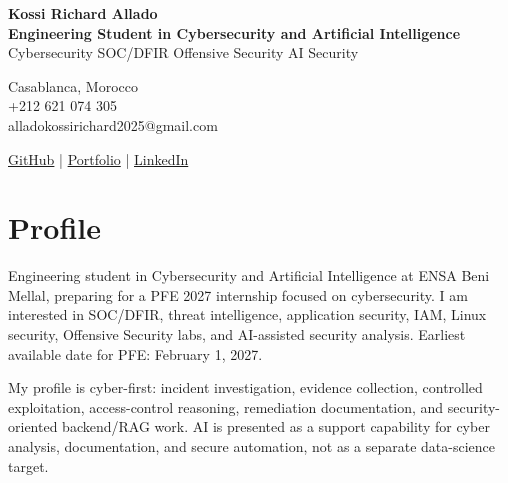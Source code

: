 \documentclass[10pt,a4paper]{article}
\begin{document}
\fontsize{10}{11.7}\selectfont

\begin{minipage}[t]{0.60\textwidth}
{\LARGE \textbf{Kossi Richard Allado}}\\[2pt]
\textbf{Engineering Student in Cybersecurity and Artificial Intelligence}\\[1pt]
Cybersecurity \textbar{} SOC/DFIR \textbar{} Offensive Security \textbar{} AI Security
\end{minipage}
\hfill
\begin{minipage}[t]{0.36\textwidth}
\raggedleft
Casablanca, Morocco\\
+212 621 074 305\\
alladokossirichard2025@gmail.com
\end{minipage}

\vspace{4pt}
\footnotesize
\href{https://github.com/ALLAKORI}{GitHub} \quad | \quad
\href{https://allakori.github.io/}{Portfolio} \quad | \quad
\href{https://www.linkedin.com/in/kossi-richard-allado-50177b2a5}{LinkedIn}
\normalsize

\section{Profile}
Engineering student in Cybersecurity and Artificial Intelligence at ENSA Beni Mellal, preparing for a PFE 2027 internship focused on cybersecurity. I am interested in SOC/DFIR, threat intelligence, application security, IAM, Linux security, Offensive Security labs, and AI-assisted security analysis. Earliest available date for PFE: February 1, 2027.

My profile is cyber-first: incident investigation, evidence collection, controlled exploitation, access-control reasoning, remediation documentation, and security-oriented backend/RAG work. AI is presented as a support capability for cyber analysis, documentation, and secure automation, not as a separate data-science target.
\end{document}

